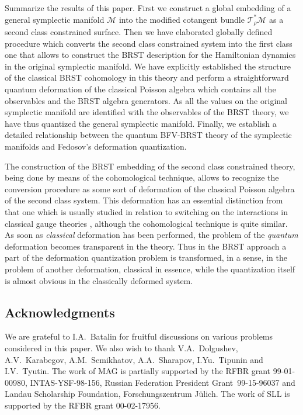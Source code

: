 \documentclass[a4paper,11pt,oneside]{amsart}
\theoremstyle{plain}
\numberwithin{equation}{section} %
\numberwithin{figure}{section} %
\def\mod{{\mathcal T}^*_\rho}
\def\manM{{\mathcal M}}
\begin{document}
\noindent
Summarize the results of this paper.  First we construct a global
embedding of a general symplectic manifold $\manM$
into the modified cotangent bundle $\mod\manM$ as a second class
constrained surface.  Then we have elaborated globally defined procedure
which converts the second class constrained system into the first
class one that allows to construct the BRST description
for the Hamiltonian dynamics in the original
symplectic manifold.  We have explicitly established
the structure of the classical BRST
cohomology in this theory and perform a straightforward quantum
deformation of the classical Poisson algebra which contains all the
observables and the BRST algebra generators.  As all the values
on the original symplectic manifold are identified with the
observables of the BRST theory, we have thus quantized the
general symplectic manifold.  Finally, we establish a detailed
relationship between the quantum BFV-BRST theory of the symplectic
manifolds and Fedosov's deformation quantization.


\noindent
The construction of the BRST embedding of the second
class constrained theory, being done by means of the
cohomological technique, allows to recognize the
conversion procedure as some sort of deformation of the classical
Poisson algebra of the second class system. This deformation has an essential
distinction from that one which is usually studied in relation to switching
on the interactions in classical gauge theories \cite{henneaux-deform},
although the cohomological technique is quite similar. As
soon as {\it classical} deformation has been performed, the problem of the
{\it quantum} deformation becomes transparent in the theory.  Thus in the
BRST approach a part of the deformation quantization problem is transformed,
in a sense, in the problem of another deformation, classical in essence,
while the quantization itself is almost obvious in the classically deformed
system.



\subsection*{Acknowledgments}
We are grateful to I.A.~Batalin for fruitful discussions
on various problems considered in this paper. We also wish
to thank V.A.~Dolgushev, A.V.~Karabegov, A.M.~Semikhatov,
A.A.~Sharapov, I.Yu.~Tipunin and I.V.~Tyutin.  The work of
MAG is partially supported by the RFBR grant 99-01-00980,
INTAS-YSF-98-156, Russian Federation President Grant~99-15-96037
and Landau Scholarship Foundation, Forschungszentrum
J\"ulich.  The work of SLL is supported by the
RFBR grant 00-02-17956.
\end{document}
